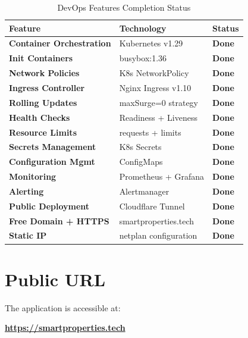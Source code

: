 \documentclass[12pt,a4paper]{report}
\begin{document}
\begin{table}[H]
  \centering
  \begin{tabular}{>{\bfseries}p{5cm} p{5cm} p{3cm}}
    \toprule
    \textbf{Feature} & \textbf{Technology} & \textbf{Status} \\
    \midrule
    Container Orchestration & Kubernetes v1.29 & \textcolor{successgreen}{\textbf{Done}} \\
    Init Containers & busybox:1.36 & \textcolor{successgreen}{\textbf{Done}} \\
    Network Policies & K8s NetworkPolicy & \textcolor{successgreen}{\textbf{Done}} \\
    Ingress Controller & Nginx Ingress v1.10 & \textcolor{successgreen}{\textbf{Done}} \\
    Rolling Updates & maxSurge=0 strategy & \textcolor{successgreen}{\textbf{Done}} \\
    Health Checks & Readiness + Liveness & \textcolor{successgreen}{\textbf{Done}} \\
    Resource Limits & requests + limits & \textcolor{successgreen}{\textbf{Done}} \\
    Secrets Management & K8s Secrets & \textcolor{successgreen}{\textbf{Done}} \\
    Configuration Mgmt & ConfigMaps & \textcolor{successgreen}{\textbf{Done}} \\
    Monitoring & Prometheus + Grafana & \textcolor{successgreen}{\textbf{Done}} \\
    Alerting & Alertmanager & \textcolor{successgreen}{\textbf{Done}} \\
    Public Deployment & Cloudflare Tunnel & \textcolor{successgreen}{\textbf{Done}} \\
    Free Domain + HTTPS & smartproperties.tech & \textcolor{successgreen}{\textbf{Done}} \\
    Static IP & netplan configuration & \textcolor{successgreen}{\textbf{Done}} \\
    \bottomrule
  \end{tabular}
  \caption{DevOps Features Completion Status}
\end{table}

\section{Public URL}

The application is accessible at:

\begin{center}
  \Large\textbf{\textcolor{primaryblue}{\href{https://smartproperties.tech}{https://smartproperties.tech}}}
\end{center}
\end{document}
